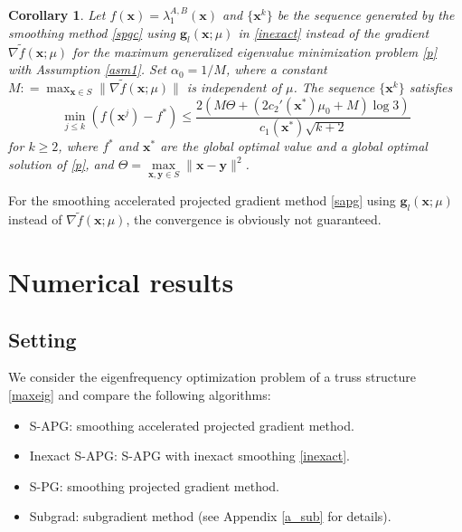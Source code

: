\documentclass[sn-mathphys,Numbered]{sn-jnl}%
\theoremstyle{thmstyleone}%
\theoremstyle{thmstyletwo}%
\theoremstyle{thmstylethree}%
\newtheorem{corollary}[theorem]{Corollary}
\newcommand{\e}[1]{\begin{equation}#1\end{equation}}
\def\coloneq{\mathrel{\mathop:}=}
\def\lamx{\lambda^{A,B}_1(\boldsymbol{x})}
\begin{document}
\begin{corollary}
Let $f(\bm{x})=\lamx$ and $\{\bm{x}^k\}$ be the sequence generated by the smoothing method \eqref{spgc} using $\bm{g}_l(\bm{x};\mu)$ in \eqref{inexact} instead of the gradient $\nabla\tilde{f}(\bm{x};\mu)$ for the maximum generalized eigenvalue minimization problem \eqref{p} with Assumption \ref{asm1}. Set $\alpha_{0}=1/M$, where a constant $M\coloneq\max_{\bm{x}\in S}\|\nabla \tilde{f}(\bm{x};\mu)\|$ is independent of $\mu$. The sequence $\{\bm{x}^k\}$ satisfies
\e{
\underset{j\le k}{\min}\left(f(\bm{x}^j)-f^*\right) \le \frac{2(M\Theta+(2c_2'(\bm{x}^*)\mu_0+M)\log 3)}{c_1(\bm{x}^*)\sqrt{k+2}}
}
for $k\ge 2$, where $f^*$ and $\bm{x}^*$ are the global optimal value and a global optimal solution of \eqref{p}, and $\Theta=\underset{\bm{x},\bm{y}\in S}{\max}\|\bm{x}-\bm{y}\|^2$.
\label{c_inexact_rate}
\end{corollary}

For the smoothing accelerated projected gradient method \eqref{sapg} using $\bm{g}_l(\bm{x};\mu)$ instead of $\nabla\tilde{f}(\bm{x};\mu)$, the convergence is obviously not guaranteed.

\section{Numerical results}

\subsection{Setting}

We consider the eigenfrequency optimization problem of a truss structure \eqref{maxeig} and compare the following algorithms:

\begin{itemize}
\item S-APG: smoothing accelerated projected gradient method.
\item Inexact S-APG: S-APG with inexact smoothing \eqref{inexact}.
\item S-PG: smoothing projected gradient method.
\item Subgrad: subgradient method \cite{kiwiel01} (see Appendix \ref{a_sub} for details).
\end{itemize}
\end{document}
